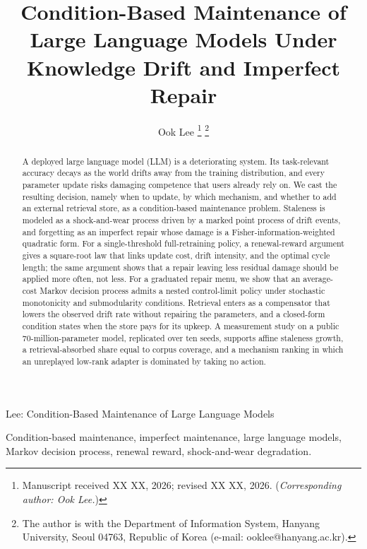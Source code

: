 \documentclass[journal]{IEEEtran}
\begin{document}
\title{Condition-Based Maintenance of Large Language Models Under Knowledge Drift and Imperfect Repair}

\author{Ook Lee%
\thanks{Manuscript received XX XX, 2026; revised XX XX, 2026. (\emph{Corresponding author: Ook Lee.})}%
\thanks{The author is with the Department of Information System, Hanyang University, Seoul 04763, Republic of Korea (e-mail: ooklee@hanyang.ac.kr).}}

%
{Lee: Condition-Based Maintenance of Large Language Models}

\maketitle

\begin{abstract}
A deployed large language model (LLM) is a deteriorating system. Its task-relevant accuracy decays as the world drifts away from the training distribution, and every parameter update risks damaging competence that users already rely on. We cast the resulting decision, namely when to update, by which mechanism, and whether to add an external retrieval store, as a condition-based maintenance problem. Staleness is modeled as a shock-and-wear process driven by a marked point process of drift events, and forgetting as an imperfect repair whose damage is a Fisher-information-weighted quadratic form. For a single-threshold full-retraining policy, a renewal-reward argument gives a square-root law that links update cost, drift intensity, and the optimal cycle length; the same argument shows that a repair leaving less residual damage should be applied more often, not less. For a graduated repair menu, we show that an average-cost Markov decision process admits a nested control-limit policy under stochastic monotonicity and submodularity conditions. Retrieval enters as a compensator that lowers the observed drift rate without repairing the parameters, and a closed-form condition states when the store pays for its upkeep. A measurement study on a public 70-million-parameter model, replicated over ten seeds, supports affine staleness growth, a retrieval-absorbed share equal to corpus coverage, and a mechanism ranking in which an unreplayed low-rank adapter is dominated by taking no action.
\end{abstract}

\begin{IEEEkeywords}
Condition-based maintenance, imperfect maintenance, large language models, Markov decision process, renewal reward, shock-and-wear degradation.
\end{IEEEkeywords}
\end{document}
